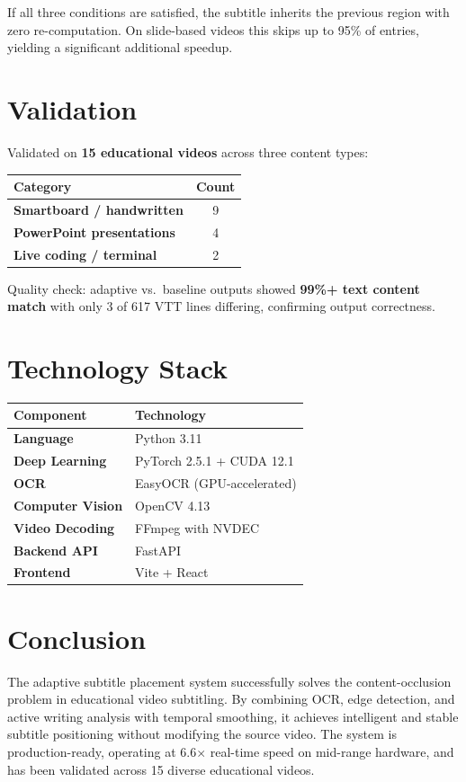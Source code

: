 \documentclass[11pt]{article}
\begin{document}
If all three conditions are satisfied, the subtitle inherits the previous region with zero re-computation. On slide-based videos this skips up to 95\% of entries, yielding a significant additional speedup.

\section{Validation}
Validated on \textbf{15 educational videos} across three content types:

\begin{center}
\begin{tabularx}{0.7\textwidth}{>{\bfseries}l c}
\toprule
Category & Count \\
\midrule
Smartboard / handwritten & 9 \\
PowerPoint presentations & 4 \\
Live coding / terminal & 2 \\
\bottomrule
\end{tabularx}
\end{center}

Quality check: adaptive vs.\ baseline outputs showed \textbf{99\%+ text content match} with only 3 of 617 VTT lines differing, confirming output correctness.

\section{Technology Stack}

\begin{center}
\begin{tabularx}{0.85\textwidth}{>{\bfseries}l X}
\toprule
Component & Technology \\
\midrule
Language & Python 3.11 \\
Deep Learning & PyTorch 2.5.1 + CUDA 12.1 \\
OCR & EasyOCR (GPU-accelerated) \\
Computer Vision & OpenCV 4.13 \\
Video Decoding & FFmpeg with NVDEC \\
Backend API & FastAPI \\
Frontend & Vite + React \\
\bottomrule
\end{tabularx}
\end{center}

\section{Conclusion}
The adaptive subtitle placement system successfully solves the content-occlusion problem in educational video subtitling. By combining OCR, edge detection, and active writing analysis with temporal smoothing, it achieves intelligent and stable subtitle positioning without modifying the source video. The system is production-ready, operating at 6.6$\times$ real-time speed on mid-range hardware, and has been validated across 15 diverse educational videos.
\end{document}

